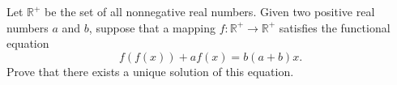 Let $\mathbb{R}^+$ be the set of all nonnegative real numbers. Given two positive real numbers $a$ and $b$, suppose that a mapping $f : \mathbb{R}^+ \to \mathbb{R}^+$ satisfies the functional equation
\[ f(f(x)) + af(x) = b(a + b)x. \]
Prove that there exists a unique solution of this equation.

